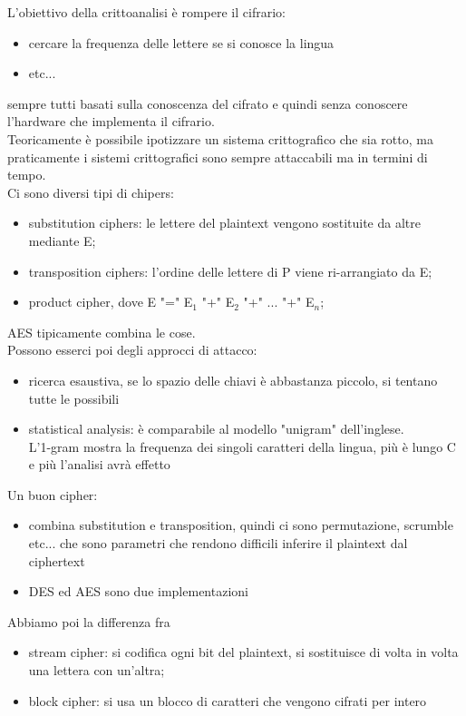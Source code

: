 \documentclass[oneside, 12pt]{extbook}
\begin{document}
L'obiettivo della crittoanalisi è rompere il cifrario:
\begin{itemize}
	\item  cercare la frequenza delle lettere se si conosce la lingua
	\item etc...
\end{itemize}
sempre tutti basati sulla conoscenza del cifrato e quindi senza conoscere l'hardware che implementa il cifrario.\\Teoricamente è possibile ipotizzare un sistema crittografico che sia rotto, ma praticamente i sistemi crittografici sono sempre attaccabili ma in termini di tempo.\\Ci sono diversi tipi di chipers:
\begin{itemize}
	\item substitution ciphers: le lettere del plaintext vengono sostituite da altre mediante E;
	\item transposition ciphers: l'ordine delle lettere di P viene ri-arrangiato da E;
	\item product cipher, dove E "=" E$_1$ "+" E$_2$ "+" ... "+" E$_n$;
\end{itemize}
AES tipicamente combina le cose.\\Possono esserci poi degli approcci di attacco:
\begin{itemize}
	\item ricerca esaustiva, se lo spazio delle chiavi è abbastanza piccolo, si tentano tutte le possibili
	\item statistical analysis: è comparabile al modello "unigram" dell'inglese.
	\\L'1-gram mostra la frequenza dei singoli caratteri della lingua, più è lungo C e più l'analisi avrà effetto
\end{itemize}
Un buon cipher:
\begin{itemize}
	\item combina substitution e transposition, quindi ci sono permutazione, scrumble etc... che sono parametri che rendono difficili inferire il plaintext dal ciphertext
	\item DES ed AES sono due implementazioni
\end{itemize}
Abbiamo poi la differenza fra
\begin{itemize}
	\item stream cipher: si codifica ogni bit del plaintext, si sostituisce di volta in volta una lettera con un'altra;
	\item block cipher: si usa un blocco di caratteri che vengono cifrati per intero
\end{itemize}
\end{document}
